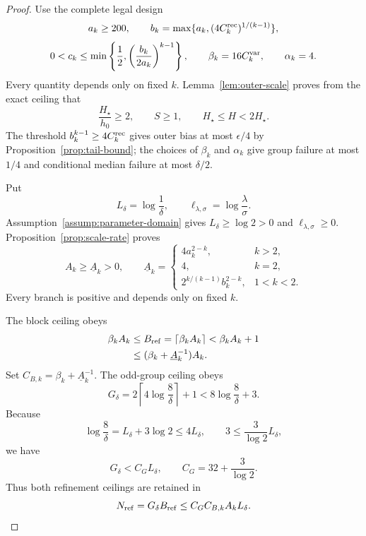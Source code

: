\begin{proof}
Use the complete legal design
\[
 a_k\geq200,
 \qquad b_k=\max\{a_k,(4C_k^{\rm rec})^{1/(k-1)}\},
\]
\[
 0<c_k\leq\min\left\{\frac12,
 \left(\frac{b_k}{2a_k}\right)^{k-1}\right\},
 \qquad \beta_k=16C_k^{\rm var},
 \qquad \alpha_k=4.
\]
Every quantity depends only on fixed $k$.  Lemma~\ref{lem:outer-scale}
proves from the exact ceiling that
\[
 \frac{H_\star}{h_0}\geq2,\qquad S\geq1,\qquad
 H_\star\leq H<2H_\star.
\]
The threshold $b_k^{k-1}\geq4C_k^{\rm rec}$ gives outer bias at most
$\epsilon/4$ by Proposition~\ref{prop:tail-bound}; the choices of
$\beta_k$ and $\alpha_k$ give group failure at most $1/4$ and conditional
median failure at most $\delta/2$.

Put
\[
 L_\delta=\log\frac1\delta,
 \qquad \ell_{\lambda,\sigma}=\log\frac\lambda\sigma.
\]
Assumption~\ref{assump:parameter-domain} gives
$L_\delta\geq\log2>0$ and $\ell_{\lambda,\sigma}\geq0$.
Proposition~\ref{prop:scale-rate} proves
\[
 A_k\geq\underline A_k>0,
 \qquad
 \underline A_k=
 \begin{cases}
 4a_k^{2-k},&k>2,\\
 4,&k=2,\\
 2^{k/(k-1)}b_k^{2-k},&1<k<2.
 \end{cases}
\]
Every branch is positive and depends only on fixed $k$.

The block ceiling obeys
\[
\begin{aligned}
 \beta_kA_k
 &\leq B_{\rm ref}=\lceil\beta_kA_k\rceil
 <\beta_kA_k+1\\
 &\leq(\beta_k+\underline A_k^{-1})A_k.
\end{aligned}
\]
Set $C_{B,k}=\beta_k+\underline A_k^{-1}$.  The odd-group ceiling obeys
\[
 G_\delta=2\left\lceil4\log\frac8\delta\right\rceil+1
 <8\log\frac8\delta+3.
\]
Because
\[
 \log\frac8\delta=L_\delta+3\log2\leq4L_\delta,
 \qquad 3\leq\frac3{\log2}L_\delta,
\]
we have
\[
 G_\delta<C_GL_\delta,
 \qquad C_G=32+\frac3{\log2}.
\]
Thus both refinement ceilings are retained in
\[
 N_{\rm ref}=G_\delta B_{\rm ref}
 \leq C_GC_{B,k}A_kL_\delta.
\]


\end{proof}
